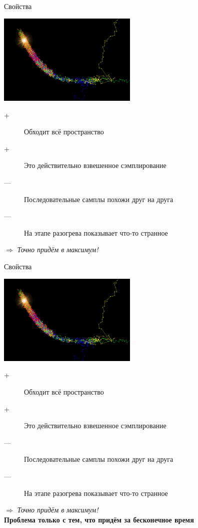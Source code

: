 \documentclass[14pt, fleqn, xcolor={dvipsnames, table}]{beamer}
\begin{document}
\begin{frame}{Свойства}
\begin{center}
\includegraphics[width=0.5\textwidth]{mcmc.png}
\end{center}
\footnotesize
\begin{description}
  \item[\color{green}+] Обходит всё пространство
  \item[\color{green}+] Это действительно взвешенное сэмплирование
  \item[\color{red}---] Последовательные самплы похожи друг на друга
  \item[\color{red}---] На этапе разогрева показывает что-то странное
\end{description}
$\Rightarrow$ \textit{Точно придём в максимум!} \\
\end{frame}

\begin{frame}{Свойства}
\begin{center}
\includegraphics[width=0.5\textwidth]{mcmc.png}
\end{center}
\footnotesize
\begin{description}
  \item[\color{green}+] Обходит всё пространство
  \item[\color{green}+] Это действительно взвешенное сэмплирование
  \item[\color{red}---] Последовательные самплы похожи друг на друга
  \item[\color{red}---] На этапе разогрева показывает что-то странное
\end{description}
$\Rightarrow$ \textit{Точно придём в максимум!} \\
\textbf{Проблема только с тем, что придём за бесконечное время}
\end{frame}
\end{document}
